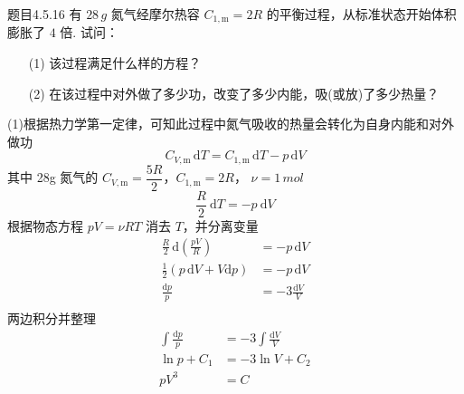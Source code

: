 \begin{question}{题目4.5.16}
    有 $28 \,\si{g}$ 氮气经摩尔热容 $C_{1,\mathrm{m}} =2R$ 的平衡过程，从标准状态开始体积膨胀了 $4$ 倍. 试问：
    \begin{enumerate}
        \item[(1)] 该过程满足什么样的方程？
        \item[(2)] 在该过程中对外做了多少功，改变了多少内能，吸(或放)了多少热量？
    \end{enumerate}
\end{question}
\begin{solution}
    (1)根据热力学第一定律，可知此过程中氮气吸收的热量会转化为自身内能和对外做功
    $$
        C_{V,\mathrm{m}} \,\mathrm{d}T = C_{1,\mathrm{m}} \,\mathrm{d}T - p \,\mathrm{d}V
    $$
    其中 28g 氮气的 $C_{V,\mathrm{m}} = \dfrac{5R}{2}$，$C_{1,\mathrm{m}} = 2R$， $\nu = 1 \,\si{mol}$
    $$
        \frac{R}{2} \ \mathrm{d}T = -p \ \mathrm{d}V
    $$
    根据物态方程 $pV = \nu RT$ 消去 $T$，并分离变量
    $$
        \begin{aligned}
            \frac{R}{2} \,\mathrm{d}\left(\frac{pV}{R}\right)      & = -p \,\mathrm{d}V         \\
            \frac{1}{2} \left(p\,\mathrm{d}V + V\mathrm{d}p\right) & = -p \,\mathrm{d}V         \\
            \frac{\mathrm{d}p}{p}                                  & = -3 \frac{\mathrm{d}V}{V} \\
        \end{aligned}
    $$
    两边积分并整理
    $$
        \begin{aligned}
            \int\frac{\mathrm{d}p}{p} & = -3 \int\frac{\mathrm{d}V}{V} \\
            \ln{p} + C_1              & = -3\ln{V} + C_2               \\
            pV^3                      & = C
        \end{aligned}
    $$

\end{solution}
